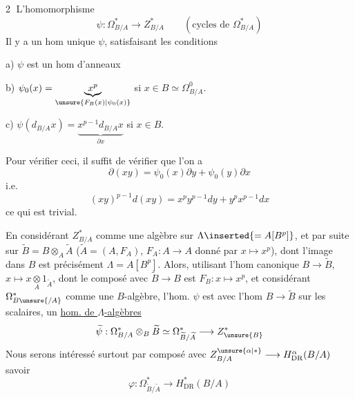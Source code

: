 \textcircled{2} L'homomorphisme
\[
 \psi:\Omega^*_{B/A}\longrightarrow Z^*_{B/A}\qquad
 (\text{cycles de }\Omega^*_{B/A})
\]
Il y a un hom unique $\psi$, satisfaisant les conditions

a) $\psi$ est un hom d'anneaux

b) $\psi_0(x)=\underbrace{x^p}_{\unsure{F_B(x)|\psi_0(x)}}$ si $x\in B\simeq\Omega^0_{B/A}$.

c) $\psi(d_{B/A}x)=\underbrace{x^{p-1}d_{B/A}x}_{\partial x}$ si $x\in B$.

Pour vérifier ceci, il suffit de vérifier que l'on a
\[
 \partial(xy)=\psi_0(x)\partial y+\psi_0(y)\partial x
\]
i.e.
\[
 (xy)^{p-1}d(xy)=x^py^{p-1}dy+y^px^{p-1}dx
\]
ce qui est trivial.

En considérant $Z^*_{B/A}$ comme une algèbre sur $\Lambda\inserted{=A[B^p]}$, et par suite sur $\widetilde B=B\otimes_A\widetilde A$ ($\widetilde A=(A,F_A)$, $F_A:A\longrightarrow A$ donné par $x\mapsto x^p$),
dont l'image dans $B$ est précisément $\Lambda=A[B^p]$. Alors, utilisant l'hom canonique $B\longrightarrow\widetilde B$, $x\longmapsto x\underset A\otimes1_{\widetilde A}$, dont le composé avec $\widetilde B\longrightarrow B$ est $F_B:x\longmapsto x^p$, et considérant $\Omega^*_{B\unsure{/A}}$ comme une $B$-algèbre, l'hom. $\psi$ est  avec l'hom $B\longrightarrow\widetilde B$ sur les scalaires,  un \uline{hom. de $\Lambda$-algèbres}
\[
 \widetilde\psi:\Omega^*_{B/A}\otimes_B\widetilde B\simeq
 \Omega^*_{\widetilde B/\widetilde A}\longrightarrow Z^*_{\unsure{B}}
\]
 Nous serons intéressé surtout par  composé avec $Z^{\unsure{\alpha|*}}_{B/A}\longrightarrow H^\alpha_{\mathrm{DR}}(B/A)$ savoir
\[
 \boxed{\varphi:\Omega^*_{\widetilde B/\widetilde A}\longrightarrow H^*_{\mathrm{DR}}(B/A)}
\]

